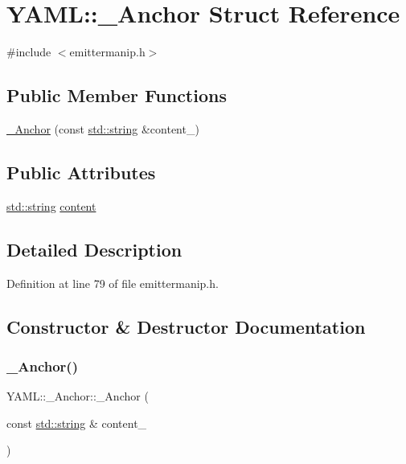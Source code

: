 \hypertarget{struct_y_a_m_l_1_1___anchor}{}\section{Y\+A\+ML\+::\+\_\+\+Anchor Struct Reference}
\label{struct_y_a_m_l_1_1___anchor}


{\ttfamily \#include $<$emittermanip.\+h$>$}

\subsection*{Public Member Functions}
\begin{DoxyCompactItemize}
\item 
\mbox{\hyperlink{struct_y_a_m_l_1_1___anchor_a1db6f44cbd952358dcc073aa1328c4e7}{\+\_\+\+Anchor}} (const \mbox{\hyperlink{glad_8h_ac83513893df92266f79a515488701770}{std\+::string}} \&content\+\_\+)
\end{DoxyCompactItemize}
\subsection*{Public Attributes}
\begin{DoxyCompactItemize}
\item 
\mbox{\hyperlink{glad_8h_ac83513893df92266f79a515488701770}{std\+::string}} \mbox{\hyperlink{struct_y_a_m_l_1_1___anchor_ad6ceeb24927d1ab467ef97378ca0e251}{content}}
\end{DoxyCompactItemize}


\subsection{Detailed Description}


Definition at line 79 of file emittermanip.\+h.



\subsection{Constructor \& Destructor Documentation}
\mbox{\label{struct_y_a_m_l_1_1___anchor_a1db6f44cbd952358dcc073aa1328c4e7}} 
\subsubsection{\texorpdfstring{\_Anchor()}{\_Anchor()}}
{\footnotesize\ttfamily Y\+A\+M\+L\+::\+\_\+\+Anchor\+::\+\_\+\+Anchor (\begin{DoxyParamCaption}\item[{const \mbox{\hyperlink{glad_8h_ac83513893df92266f79a515488701770}{std\+::string}} \&}]{content\+\_\+ }\end{DoxyParamCaption})\hspace{0.3cm}{\ttfamily [inline]}}



